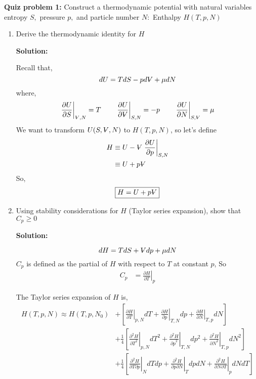 \documentclass[10pt]{article}
\newenvironment{Solution}
    {\textbf{Solution:}
    
    \vspace{5mm}
    \begin{tcolorbox}
    }
    {
    \end{tcolorbox}
    \vspace{5mm}
    }
\newcommand{\vol}{{\ooalign{\hfil$V$\hfil\cr\kern0.08em--\hfil\cr}}}
\begin{document}
\noindent\textbf{Quiz problem 1:}  Construct a thermodynamic potential with natural variables entropy $S,$ pressure $p,$ and particle number $N:$ Enthalpy $H(T, p, N)$
\begin{enumerate}
\item  Derive the thermodynamic identity for $H$

\begin{Solution}
Recall that,
\begin{equation}
    dU = TdS - pd\vol +\mu dN 
\end{equation}
where,
\begin{equation}
    \left.\frac{\partial U}{\partial S}\right|_{\scriptsize{\vol}, N} = T \qquad \left.\frac{\partial U}{\partial \vol}\right|_{S, N} = -p \qquad \left.\frac{\partial U}{\partial N}\right|_{\scriptsize{S,\vol}} = \mu  
\end{equation}
We want to transform $U(S,\vol,N)$ to $H(T, p, N)$, so let's define 
\begin{align}
    H&\equiv U - \vol\left.\frac{\partial U}{\partial p}\right|_{S, N}\\
    &\equiv U + p\vol 
\end{align}  
So,
\begin{equation}
    \boxed{
    H = U + p\vol 
    }
\end{equation}
\end{Solution}

\item Using stability considerations for $H$ (Taylor series expansion), show that $C_{p} \geq 0$

\begin{Solution}
\begin{equation}
    dH = TdS + \vol dp +\mu dN
\end{equation}
$C_p$ is defined as the partial of $H$ with respect to $T$ at constant $p$, So
\begin{align}
    C_p &= \left.\frac{\partial H}{\partial T}\right|_p
\end{align}

The Taylor series expansion of $H$ is,
\begin{align}
    H\left(T,p,N\right) \approx H\left(T,p,N_0\right) &+ \left[\left.\frac{\partial H}{\partial T}\right|_{p,N} dT + \left.\frac{\partial H}{\partial p}\right|_{T,N} dp  + \left.\frac{\partial H}{\partial N}\right|_{T,p} dN\right] \\&+ \frac{1}{4}\left[\left.\frac{\partial^2 H}{{\partial T}^2}\right|_{p,N} dT^2 + \left.\frac{\partial^2 H}{{\partial p}^2}\right|_{T,N} dp^2  + \left.\frac{\partial^2 H}{{\partial N}^2}\right|_{T,p} dN^2\right] \\&+ \frac{1}{4}\left[\left.\frac{\partial^2 H}{{\partial T \partial p}}\right|_{N} dT dp + \left.\frac{\partial^2 H}{{\partial p \partial N}}\right|_{T} dp dN  + \left.\frac{\partial^2 H}{{\partial N \partial T}}\right|_{p} dN dT\right]
\end{align}


\end{Solution}
\end{enumerate}
\end{document}
